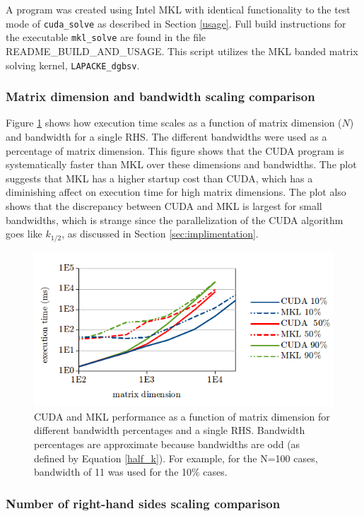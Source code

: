 \documentclass[12pt]{article}
\begin{document}
A program was created using Intel MKL with identical functionality to the test
mode of \texttt{cuda\_solve} as described in Section \ref{usage}. Full build
instructions for the executable \texttt{mkl\_solve} are found in the file
README\_BUILD\_AND\_USAGE. This script utilizes the MKL banded matrix solving kernel,
\texttt{LAPACKE\_dgbsv}.

\subsubsection{Matrix dimension and bandwidth scaling comparison}

Figure \ref{scaling} shows how execution time scales as a function of matrix
dimension ($N$) and bandwidth for a single RHS. The different bandwidths were
used as a percentage of matrix dimension. This figure shows that the CUDA
program is systematically faster than MKL over these dimensions and bandwidths.
The plot suggests that MKL has a higher startup cost than CUDA, which has a
diminishing affect on execution time for high matrix dimensions. The plot also
shows that the discrepancy between CUDA and MKL is largest for small
bandwidths, which is strange since the parallelization of the CUDA algorithm
goes like $k_{1/2}$, as discussed in Section \ref{sec:implimentation}.

\begin{figure}[H]
\caption{CUDA and MKL performance as a function of matrix dimension for different bandwidth percentages and a single RHS. Bandwidth percentages are approximate because bandwidths are odd (as defined by Equation \ref{half_k}). For example, for the N=100 cases, bandwidth of 11 was used for the 10\% cases.}
\label{scaling}
\centerline{\includegraphics[width=12cm]{full_scaling.png}}
\end{figure}

\subsubsection{Number of right-hand sides scaling comparison}
\label{sec:rhs}
\end{document}
